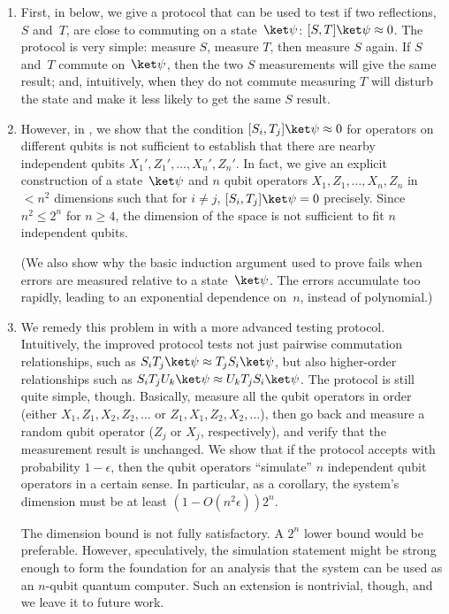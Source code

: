 \documentclass[11pt]{article}
\begin{document}
\begin{enumerate}
\item 
First, in  below, we give a protocol that can be used to test if two reflections, $S$ and~$T$, are close to commuting on a state~$\ket \psi$: $[S, T] \ket \psi \approx 0$.  The protocol is very simple: measure $S$, measure $T$, then measure $S$ again.  If $S$ and~$T$ commute on~$\ket \psi$, then the two $S$ measurements will give the same result; and, intuitively, when they do not commute measuring $T$ will disturb the state and make it less likely to get the same $S$ result.  

\item 
However, in , we show that the condition $[S_i, T_j] \ket \psi \approx 0$ for operators on different qubits is not sufficient to establish that there are nearby independent qubits $X_1', Z_1', \ldots, X_n', Z_n'$.  In fact, we give an explicit construction of a state~$\ket \psi$ and $n$ qubit operators $X_1, Z_1, \ldots, X_n, Z_n$ in $< n^2$ dimensions such that for $i \neq j$, $[S_i, T_j] \ket \psi = 0$ precisely.  Since $n^2 \leq 2^n$ for $n \geq 4$, the dimension of the space is not sufficient to fit $n$ independent qubits.  

(We also show why the basic induction argument used to prove  fails when errors are measured relative to a state~$\ket \psi$.  The errors accumulate too rapidly, leading to an exponential dependence on~$n$, instead of polynomial.)  

\item 
We remedy this problem in  with a more advanced testing protocol.  Intuitively, the improved protocol tests not just pairwise commutation relationships, such as $S_i T_j \ket \psi \approx T_j S_i \ket \psi$, but also higher-order relationships such as $S_i T_j U_k \ket \psi \approx U_k T_j S_i \ket \psi$.  The protocol is still quite simple, though.  Basically, measure all the qubit operators in order (either $X_1, Z_1, X_2, Z_2, \ldots$ or $Z_1, X_1, Z_2, X_2, \ldots$), then go back and measure a random qubit operator ($Z_j$ or $X_j$, respectively), and verify that the measurement result is unchanged.  We show that if the protocol accepts with probability $1 - \epsilon$, then the qubit operators ``simulate'' $n$ independent qubit operators in a certain sense.  In particular, as a corollary, the system's dimension must be at least $(1 - O(n^2 \epsilon)) 2^n$.  

The dimension bound is not fully satisfactory.  A $2^n$ lower bound would be preferable.  However, speculatively, the simulation statement might be strong enough to form the foundation for an analysis that the system can be used as an $n$-qubit quantum computer.  Such an extension is nontrivial, though, and we leave it to future work.  
\end{enumerate}
\end{document}
